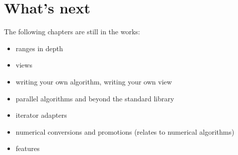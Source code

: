 \chapter{What's next}

The following chapters are still in the works:

\begin{itemize}
    \item {} ranges in depth
    \item {} views
    \item writing your own algorithm, writing your own view
    \item parallel algorithms and beyond the \CC standard library
    \item iterator adapters
    \item numerical conversions and promotions (relates to numerical algorithms)
    \item {} features
\end{itemize}

